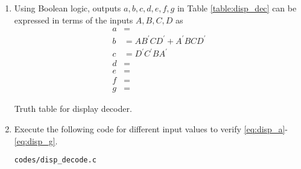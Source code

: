 \renewcommand{\theequation}{\theenumi}
\renewcommand{\thefigure}{\theenumi}
\begin{enumerate}[label=\thesection.\arabic*.,ref=\thesection.\theenumi]

\item Using Boolean logic, outputs $a,b,c,d,e,f,g$  in Table \ref{table:disp_dec} can be expressed in terms of the inputs $A,B,C,D$ as
%
\begin{align}
\label{eq:disp_a}
a &=
\\
\label{eq:disp_b}
b &= AB^{\prime}CD^{\prime}+A^{\prime}BCD^{\prime}
\\
\label{eq:disp_c}
c &= {D}^{\prime}{C}^{\prime}B{A}^{\prime}
\\
d &= 
\label{eq:disp_d}
\\
e &= 
\label{eq:disp_e}
\\
f &= 
\label{eq:disp_f}
\\
g &= 
\label{eq:disp_g}
\end{align}
\begin{table}
\centering

\caption{Truth table for display decoder.}
\label{table:disp_dec}
\end{table}

\item Execute the following code for different input values to verify 
\eqref{eq:disp_a}-\eqref{eq:disp_g}.
\label{code:disp_decode}
\begin{lstlisting}
codes/disp_decode.c
\end{lstlisting}
%
%

\end{enumerate}
%
%
